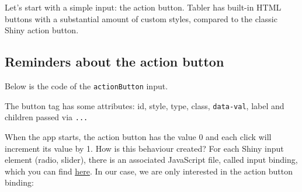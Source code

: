 \documentclass[
]{book}
\newenvironment{Shaded}{\begin{snugshade}}{\end{snugshade}}
\newcommand{\ControlFlowTok}[1]{\textcolor[rgb]{0.13,0.29,0.53}{\textbf{#1}}}
\newcommand{\DataTypeTok}[1]{\textcolor[rgb]{0.13,0.29,0.53}{#1}}
\newcommand{\KeywordTok}[1]{\textcolor[rgb]{0.13,0.29,0.53}{\textbf{#1}}}
\newcommand{\NormalTok}[1]{#1}
\newcommand{\OperatorTok}[1]{\textcolor[rgb]{0.81,0.36,0.00}{\textbf{#1}}}
\newcommand{\OtherTok}[1]{\textcolor[rgb]{0.56,0.35,0.01}{#1}}
\newcommand{\StringTok}[1]{\textcolor[rgb]{0.31,0.60,0.02}{#1}}
\begin{document}
Let's start with a simple input: the action button. Tabler has built-in HTML buttons with a substantial amount of custom styles, compared to the classic Shiny action button.

\hypertarget{reminders-about-the-action-button}{%
\subsection{Reminders about the action button}\label{reminders-about-the-action-button}}

Below is the code of the \texttt{actionButton} input.

\begin{Shaded}
\end{Shaded}

The button tag has some attributes: id, style, type, class, \texttt{data-val}, label and children passed via \texttt{...}

When the app starts, the action button has the value 0 and each click will increment its value by 1. How is this behaviour created? For each Shiny input element (radio, slider), there is an associated JavaScript file, called input binding, which you can find \href{https://github.com/rstudio/shiny/tree/master/srcjs}{here}. In our case, we are only interested in the action button binding:
\end{document}
